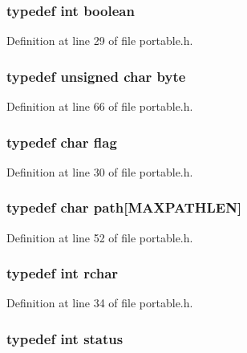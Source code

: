 \subsubsection{\setlength{\rightskip}{0pt plus 5cm}typedef int boolean}\label{portable_8h_a73}




Definition at line 29 of file portable.h.
\subsubsection{\setlength{\rightskip}{0pt plus 5cm}typedef unsigned char byte}\label{portable_8h_a80}




Definition at line 66 of file portable.h.
\subsubsection{\setlength{\rightskip}{0pt plus 5cm}typedef char flag}\label{portable_8h_a74}




Definition at line 30 of file portable.h.
\subsubsection{\setlength{\rightskip}{0pt plus 5cm}typedef char path[MAXPATHLEN]}\label{portable_8h_a79}




Definition at line 52 of file portable.h.
\subsubsection{\setlength{\rightskip}{0pt plus 5cm}typedef int rchar}\label{portable_8h_a76}




Definition at line 34 of file portable.h.
\subsubsection{\setlength{\rightskip}{0pt plus 5cm}typedef int status}\label{portable_8h_a78}




